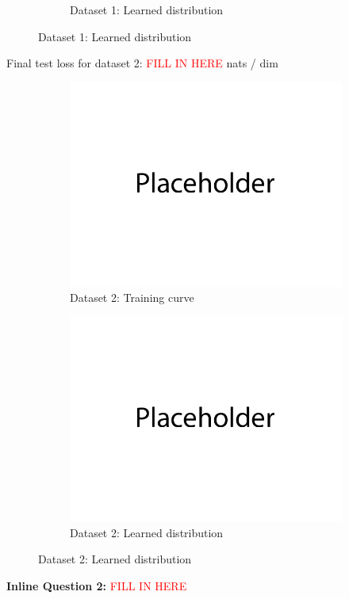 \documentclass{article}
\begin{document}
\begin{enumerate}[(a)]
\begin{figure}[H]
\begin{subfigure}{0.45\textwidth}
        \caption{Dataset 1: Learned distribution}
    \end{subfigure}
\end{figure}
Final test loss for dataset 2: \textcolor{red}{FILL IN HERE}  nats / dim
\begin{figure}[H]
    \centering
    \begin{subfigure}{0.45\textwidth}
        \centering
        \includegraphics[width=\textwidth]{figures/placeholder.png}
        \caption{Dataset 2: Training curve}
    \end{subfigure}
    \hspace{0.2in}
    \begin{subfigure}{0.45\textwidth}
        \centering
        \includegraphics[width=\textwidth]{figures/placeholder.png}
        \caption{Dataset 2: Learned distribution}
    \end{subfigure}
\end{figure}
\textbf{Inline Question 2:} \textcolor{red}{FILL IN HERE}

\end{enumerate}
\end{document}
